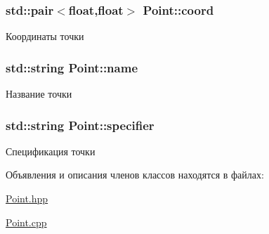 \subsubsection[{\texorpdfstring{coord}{coord}}]{\setlength{\rightskip}{0pt plus 5cm}std\+::pair$<$float,float$>$ Point\+::coord\hspace{0.3cm}{\ttfamily [private]}}\hypertarget{class_point_a681ea559a4915bf941db0204dc4f25a4}{}\label{class_point_a681ea559a4915bf941db0204dc4f25a4}


Координаты точки 

\subsubsection[{\texorpdfstring{name}{name}}]{\setlength{\rightskip}{0pt plus 5cm}std\+::string Point\+::name\hspace{0.3cm}{\ttfamily [private]}}\hypertarget{class_point_af52ec9c5dc533d46c1a67b4bbdaeae23}{}\label{class_point_af52ec9c5dc533d46c1a67b4bbdaeae23}


Название точки 

\subsubsection[{\texorpdfstring{specifier}{specifier}}]{\setlength{\rightskip}{0pt plus 5cm}std\+::string Point\+::specifier\hspace{0.3cm}{\ttfamily [private]}}\hypertarget{class_point_a5bae0fb50a1d54466360d018f800925b}{}\label{class_point_a5bae0fb50a1d54466360d018f800925b}


Спецификация точки 



Объявления и описания членов классов находятся в файлах\+:\begin{DoxyCompactItemize}
\item 
\hyperlink{_point_8hpp}{Point.\+hpp}\item 
\hyperlink{_point_8cpp}{Point.\+cpp}\end{DoxyCompactItemize}
